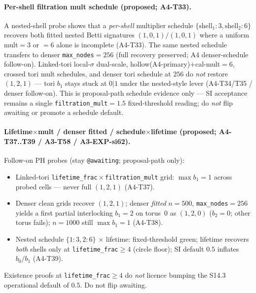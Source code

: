 \documentclass[11pt]{article}
\begin{document}
\paragraph{Per-shell filtration mult schedule (proposed; A4-T33).}
A nested-shell probe shows that a \emph{per-shell} multiplier schedule
$\{\mathrm{shell}_1{:}3,\mathrm{shell}_2{:}6\}$ recovers both fitted nested
Betti signatures $(1,0,1)/(1,0,1)$ where a uniform mult${=}3$ or ${=}6$ alone
is incomplete (A4-T33). The same nested schedule transfers to denser
\texttt{max\_nodes}${=}256$ (full recovery preserved; A4 denser-schedule
follow-on). Linked-tori local-$\sigma$ dual-scale,
hollow(A4-primary)$+$cal-mult${=}6$, crossed tori mult schedules, and denser
tori schedule at $256$ do \emph{not} restore $(1,2,1)$ --- tori $b_1$ stays
stuck at $0|1$ under the nested-style lever (A4-T34/T35 / denser follow-on).
This is proposal-path schedule evidence only --- SI acceptance remains a
single \texttt{filtration\_mult}${=}1.5$ fixed-threshold reading; do
\emph{not} flip awaiting or promote a schedule default.

\paragraph{Lifetime$\times$mult / denser fitted / schedule$\times$lifetime
(proposed; A4-T37..T39 / A3-T58 / A3-EXP-si62).}
Follow-on PH probes (stay \texttt{@awaiting}; proposal-path only):
\begin{itemize}[leftmargin=1.5em]
  \item Linked-tori \texttt{lifetime\_frac}${}\times{}$\texttt{filtration\_mult}
  grid: $\max b_1{=}1$ across probed cells --- never full $(1,2,1)$
  (A4-T37).
  \item Denser clean grids recover $(1,2,1)$; denser \emph{fitted}
  $n{=}500$, \texttt{max\_nodes}${=}256$ yields a first partial interlocking
  $b_1{=}2$ on torus~$0$ as $(1,2,0)$ ($b_2{=}0$; other torus fails);
  $n{=}1000$ still $\max b_1{=}1$ (A4-T38).
  \item Nested schedule $\{1{:}3,2{:}6\}$ $\times$ lifetime: fixed-threshold
  green; lifetime recovers \emph{both} shells only at
  \texttt{lifetime\_frac}${}\ge 4$ (circle floor); SI default $0.5$ inflates
  $b_0/b_1$ (A4-T39).
\end{itemize}
Existence proofs at \texttt{lifetime\_frac}${}\ge 4$ do \emph{not} licence
bumping the S14.3 operational default of $0.5$. Do not flip awaiting.
\end{document}
